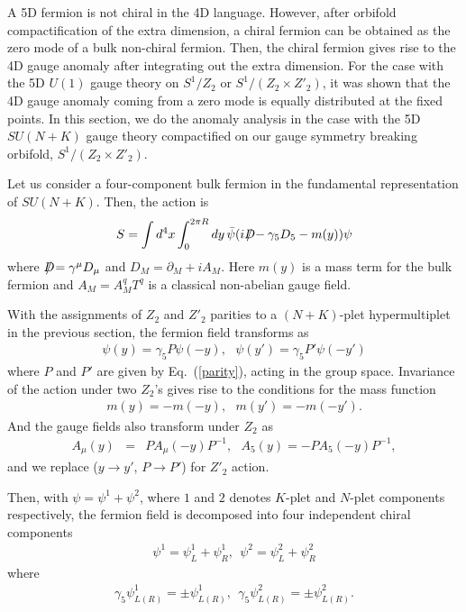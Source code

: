 \documentclass[a4paper,12pt]{article}
\begin{document}
A 5D fermion is not chiral in the 4D language. However, after orbifold
compactification of the extra dimension, a chiral fermion can be
obtained as the zero mode of a bulk non-chiral fermion.
Then, the chiral fermion gives rise to the 4D gauge anomaly after
integrating out the extra dimension. For the case with the 5D $U(1)$ gauge
theory on $S^1/Z_2$\cite{ah} or $S^1/(Z_2\times Z'_2)$\cite{scrucca},
it was shown that the 4D gauge anomaly coming from a zero mode is equally
distributed at the fixed points.
In this section, we do the anomaly analysis in the case
with the 5D $SU(N+K)$ gauge theory compactified on our gauge symmetry
breaking orbifold, $S^1/(Z_2\times Z'_2)$.

Let us consider a four-component bulk fermion in the fundamental representation
of $SU(N+K)$. Then, the action is
\begin{eqnarray}
S=\int d^4 x \int_0^{2\pi R} dy\, \bar{\psi}(iD\hspace{-2.5mm}/
-\gamma_5 D_5-m(y))\psi \label{5daction}
\end{eqnarray}
where $D\hspace{-2.5mm}/=\gamma^\mu D_\mu $ and
$D_M=\partial_M+iA_M$. Here $m(y)$ is a mass term for the bulk fermion and 
$A_M=A^q_M T^q$ is a classical
 non-abelian gauge field.

With the assignments of $Z_2$ and $Z'_2$ parities to a $(N+K)$-plet
hypermultiplet in the previous section, the fermion field transforms as
\begin{eqnarray}
\psi(y)=\gamma_5 P\psi(-y), \ \ \ \psi(y')=\gamma_5 P'\psi(-y')
\end{eqnarray}
where $P$ and $P'$ are given by Eq.~(\ref{parity}), acting in the group space.
Invariance of the action under two $Z_2$'s gives rise to
the conditions for the mass function
\begin{eqnarray}
m(y)=-m(-y), \ \ \ m(y')=-m(-y').
\end{eqnarray}
And the gauge fields also transform under $Z_2$ as
\begin{eqnarray}
A_\mu(y)&=&P A_\mu(-y) P^{-1}, \ \ \ A_5(y)=-P A_5(-y)P^{-1},
\end{eqnarray}
and we replace ($y\rightarrow y'$, $P\rightarrow P'$) for $Z'_2$ action.

Then, with $\psi=\psi^1+\psi^2$, where $1$ and $2$ denotes
$K$-plet and $N$-plet components respectively, the fermion field
is decomposed into four independent chiral components
\begin{eqnarray}
\psi^1=\psi^1_L+\psi^1_R, \ \ \psi^2=\psi^2_L+\psi^2_R
\end{eqnarray}
where
\begin{eqnarray}
\gamma_5\psi^1_{L(R)}=\pm\psi^1_{L(R)}, \ \
\gamma_5\psi^2_{L(R)}=\pm\psi^2_{L(R)}.
\end{eqnarray}
\end{document}
